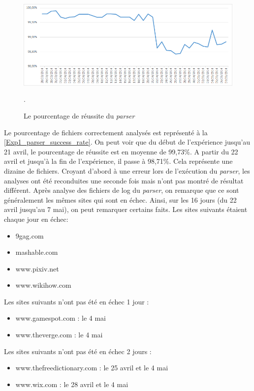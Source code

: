 \begin{figure}[h]
	\centering
	\includegraphics[scale=.8]{graphiques/Exp1_parser_success_rate.png}
	\caption{\label{Exp1_parser_success_rate}Le pourcentage de réussite du \textit{parser}}.
\end{figure}

Le pourcentage de fichiers correctement analysés est représenté à la \autoref{Exp1_parser_success_rate}. On peut voir que du début de l'expérience jusqu'au 21 avril, le pourcentage de réussite est en moyenne de 99,73\%. A partir du 22 avril et jusqu'à la fin de l'expérience, il passe à 98,71\%. Cela représente une dizaine de fichiers.
Croyant d'abord à une erreur lors de l'exécution du \textit{parser}, les analyses ont été reconduites une seconde fois mais n'ont pas montré de résultat différent.
Après analyse des fichiers de log du \textit{parser}, on remarque que ce sont généralement les mêmes sites qui sont en échec.
Ainsi, sur les 16 jours (du 22 avril jusqu'au 7 mai), on peut remarquer certains faits.
\newline
Les sites suivants étaient chaque jour en échec:
\begin{itemize}
  \item 9gag.com
  \item mashable.com
  \item www.pixiv.net
  \item www.wikihow.com
  \newline
\end{itemize}
Les sites suivants n'ont pas été en échec 1 jour :
\begin{itemize}
  \item www.gamespot.com : le 4 mai
  \item www.theverge.com : le 4 mai
  \newline
\end{itemize}
Les sites suivants n'ont pas été en échec 2 jours :
\begin{itemize}
  \item www.thefreedictionary.com : le 25 avril et le 4 mai
  \item www.wix.com : le 28 avril et le 4 mai
  \newline
\end{itemize}

